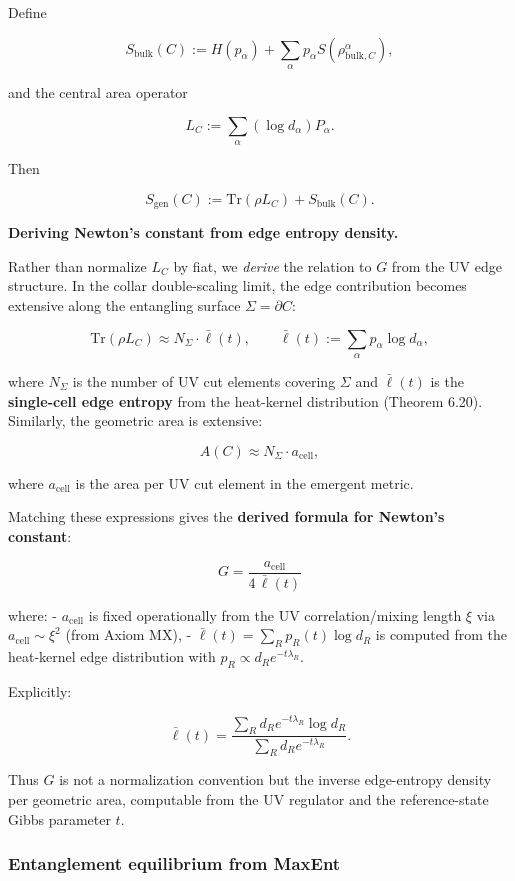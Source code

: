 \documentclass[11pt,a4paper]{article}
\theoremstyle{remark}
\begin{document}
Define

\[
S_{\mathrm{bulk}}(C) := H(p_{\alpha}) + \sum_{\alpha} p_{\alpha} S(\rho_{\mathrm{bulk},C}^{\alpha}),
\]

and the central area operator

\[
L_C := \sum_{\alpha} (\log d_{\alpha}) P_{\alpha}.
\]

Then

\[
S_{\mathrm{gen}}(C) := \mathrm{Tr}(\rho L_C) + S_{\mathrm{bulk}}(C).
\]

\textbf{Deriving Newton's constant from edge entropy density.}

Rather than normalize \(L_C\) by fiat, we \emph{derive} the relation to \(G\) from the
UV edge structure. In the collar double-scaling limit, the edge contribution
becomes extensive along the entangling surface \(\Sigma = \partial C\):

\[
\mathrm{Tr}(\rho L_C) \approx N_\Sigma \cdot \bar{\ell}(t),
\qquad
\bar{\ell}(t) := \sum_\alpha p_\alpha \log d_\alpha,
\]

where \(N_\Sigma\) is the number of UV cut elements covering \(\Sigma\) and
\(\bar{\ell}(t)\) is the \textbf{single-cell edge entropy} from the heat-kernel
distribution (Theorem 6.20). Similarly, the geometric area is extensive:

\[
A(C) \approx N_\Sigma \cdot a_{\mathrm{cell}},
\]

where \(a_{\mathrm{cell}}\) is the area per UV cut element in the emergent metric.

Matching these expressions gives the \textbf{derived formula for Newton's constant}:

\[
G = \frac{a_{\mathrm{cell}}}{4 \, \bar{\ell}(t)}
\]

where:
- \(a_{\mathrm{cell}}\) is fixed operationally from the UV correlation/mixing
length \(\xi\) via \(a_{\mathrm{cell}} \sim \xi^2\) (from Axiom MX),
- \(\bar{\ell}(t) = \sum_R p_R(t) \log d_R\) is computed from the heat-kernel
edge distribution with \(p_R \propto d_R e^{-t\lambda_R}\).

Explicitly:

\[
\bar{\ell}(t) = \frac{\sum_R d_R e^{-t\lambda_R} \log d_R}{\sum_R d_R e^{-t\lambda_R}}.
\]

Thus \(G\) is not a normalization convention but
the inverse edge-entropy density per geometric area, computable from the UV
regulator and the reference-state Gibbs parameter \(t\).

\subsubsection{Entanglement equilibrium from MaxEnt}\label{entanglement-equilibrium-from-maxent}
\end{document}
